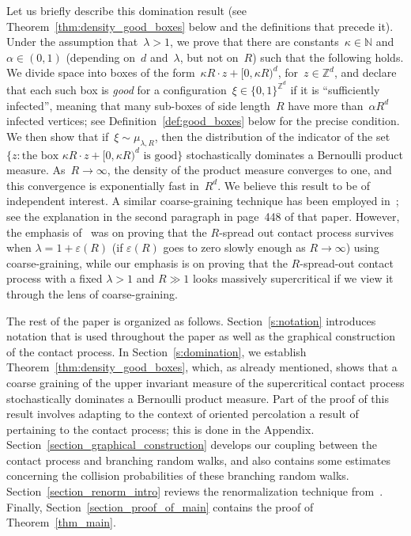\documentclass[a4paper,12pt]{article}
\newcommand{\Z}{\mathbb{Z}}
\begin{document}
Let us briefly describe this domination result (see Theorem~\ref{thm:density_good_boxes} below and the definitions that precede it). Under the assumption that~$\lambda > 1$, we prove that there are constants~$\kappa \in \mathbb{N}$ and~$\alpha \in (0,1)$ (depending on~$d$ and~$\lambda$, but not on~$R$) such that the following holds. We divide space into boxes of the form~$\kappa R \cdot z + [0,\kappa R)^d$, for~$z \in \Z^d$, and declare that each such box is \textit{good} for a configuration~$\xi \in \{0,1\}^{\Z^d}$ if it is ``sufficiently infected'', meaning that many sub-boxes of side length~$R$ have more than~$\alpha R^d$ infected vertices; see Definition~\ref{def:good_boxes} below for the precise condition. We then show that if~$\xi \sim \mu_{\lambda,R}$, then the distribution of the indicator of the set~$\{z: \text{the box~$\kappa R\cdot z + [0,\kappa R)^d$ is good} \}$ stochastically dominates a Bernoulli product measure. As~$R \to \infty$, the density of the product measure converges to one, and this convergence is exponentially fast in~$R^d$. We believe this result to be of independent interest. A similar coarse-graining technique has been employed in~\cite{bds89}; see the explanation in the second paragraph in page~448 of that paper. However, the emphasis of~\cite{bds89} was on proving that the $R$-spread out contact process survives when $\lambda=1+\varepsilon(R)$ (if $\varepsilon(R)$ goes to zero slowly enough as $R \to \infty$) using coarse-graining, while our emphasis is on proving that the $R$-spread-out contact process with a fixed $\lambda>1$ and $R \gg 1$ looks massively supercritical if we view it through the lens of coarse-graining.

\medskip

The rest of the paper is organized as follows. Section~\ref{s:notation} introduces notation that is used throughout the paper as well as the graphical construction of the contact process. In Section~\ref{s:domination}, we establish Theorem~\ref{thm:density_good_boxes}, which, as already mentioned, shows that a coarse graining of the upper invariant measure of the supercritical contact process stochastically dominates a Bernoulli product measure. Part of the proof of this result involves adapting to the context of oriented percolation a result of~\cite{LS06} pertaining to the contact process; this is done in the Appendix.
 Section~\ref{section_graphical_construction} develops our coupling between the contact process and branching random walks, and also contains some estimates concerning the collision probabilities of these branching random walks. Section~\ref{section_renorm_intro} reviews the renormalization technique from~\cite{Ra15}. Finally, Section~\ref{section_proof_of_main} contains the proof of Theorem~\ref{thm_main}.
\end{document}
